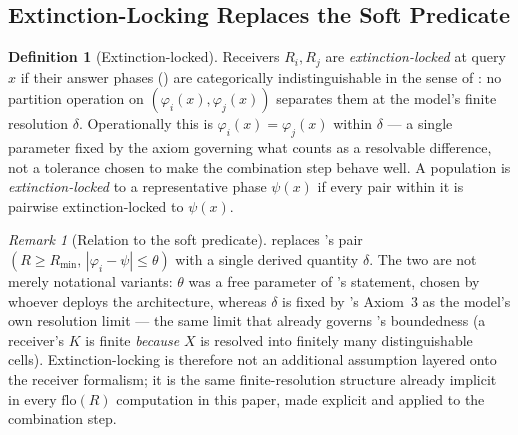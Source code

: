 \documentclass[11pt,twocolumn,a4paper]{article}
\theoremstyle{rdm}
\theoremstyle{definition}
\newtheorem{definition}[theorem]{Definition}
\theoremstyle{remark}
\newtheorem{remark}[theorem]{Remark}
\newcommand{\Cands}{X}
\newcommand{\Know}{K}
\newcommand{\flo}{\mathrm{flo}}
\newcommand{\Rec}{R}
\begin{document}
\subsection{Extinction-Locking Replaces the Soft Predicate}

\begin{definition}[Extinction-locked]
\label{def:extinction-locked}
Receivers $\Rec_i,\Rec_j$ are \emph{extinction-locked} at query $x$ if their
answer phases () are categorically indistinguishable
in the sense of : no partition
operation on $(\varphi_i(x),\varphi_j(x))$ separates them at the model's
finite resolution $\delta$. Operationally this is $\varphi_i(x)=\varphi_j(x)$
within $\delta$ — a single parameter fixed by the axiom governing what
counts as a resolvable difference, not a tolerance chosen to make the
combination step behave well. A population is \emph{extinction-locked} to a
representative phase $\psi(x)$ if every pair within it is pairwise
extinction-locked to $\psi(x)$.
\end{definition}

\begin{remark}[Relation to the soft predicate]
\label{rem:soft-vs-binary}
 replaces 's pair
$(R\ge R_{\min},\,|\varphi_i-\psi|\le\theta)$ with a single derived quantity
$\delta$. The two are not merely notational variants: $\theta$ was a free
parameter of 's statement, chosen by whoever
deploys the architecture, whereas $\delta$ is fixed by
\citet{sachikonye-coordination-regimes}'s Axiom~3 as the model's own
resolution limit — the same limit that already governs
's boundedness (a receiver's $\Know$ is finite
\emph{because} $\Cands$ is resolved into finitely many distinguishable
cells). Extinction-locking is therefore not an additional assumption
layered onto the receiver formalism; it is the same finite-resolution
structure already implicit in every $\flo(\Rec)$ computation in this paper,
made explicit and applied to the combination step.
\end{remark}
\end{document}
